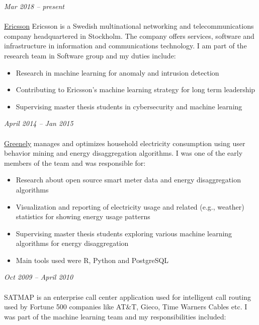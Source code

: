 \documentclass[margin, 10pt]{res} %
\begin{document}
\begin{resume}
{\sl \textbf{}} \hfill \textit{Mar 2018 -- present} \\
{\color{RubineRed}{Ericsson AB, Sweden}} \\
\href{http://www.greenely.com}{Ericsson} Ericsson is a Swedish multinational networking and telecommunications company headquartered in Stockholm. The company offers services, software and infrastructure in information and communications technology. I am part of the research team in Software group and my duties include:
\begin{itemize} 
\item Research in machine learning for anomaly and intrusion detection 
\item Contributing to Ericsson's machine learning strategy for long term leadership
\item Supervising master thesis students in cybersecurity and machine learning 
\end{itemize} 

{\sl \textbf{}} \hfill \textit{April 2014 -- Jan 2015} \\
{\color{RubineRed}{Greenely, Sweden}} \\
\href{http://www.greenely.com}{Greenely} manages and optimizes household electricity consumption using user behavior mining and energy disaggregation algorithms. I was one of the early members of the team and was responsible for:
\begin{itemize} 
\item Research about open source smart meter data and energy disaggregation algorithms
\item Visualization and reporting of electricity usage and related (e.g., weather) statistics for showing energy usage patterns
\item Supervising master thesis students exploring various machine learning algorithms for energy disaggregation 
\item Main tools used were R, Python and PostgreSQL
\end{itemize} 

{\sl {}} \hfill \textit{Oct 2009 -- April 2010} \\
{\href{http://www.satmapinc.com/}{\color{RubineRed}{Afiniti (formerly TRG SATMAP), Machine Learning Team, Pakistan}}}  \\
SATMAP is an enterprise call center application used for intelligent call routing used by Fortune 500 companies like AT\&T, Gieco, Time Warners Cables etc. I was part of the machine learning team and my responsibilities included:


\end{resume}
\end{document}
